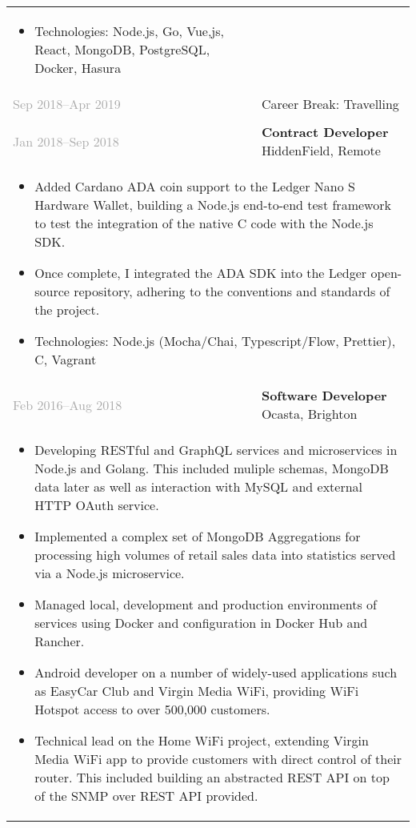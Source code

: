 \documentclass{article}
\newenvironment{exptable}{
  \begin{longtable}{lp{0.8\textwidth}}
  }{
  \end{longtable}
}
\begin{document}
\begin{exptable}
{        \begin{itemize}[leftmargin=1em]
          \item[] Technologies: Node.js, Go, Vue,js, React, MongoDB, PostgreSQL, Docker, Hasura
        \end{itemize}
      } \\

      \textcolor{darkgray}{Sep 2018--Apr 2019} & Career Break: Travelling \\
      \multicolumn{2}{p{\textwidth}}{} \\

      \textcolor{darkgray}{Jan 2018--Sep 2018} & \textbf{Contract Developer} HiddenField, Remote \\
      \multicolumn{2}{p{\textwidth}}{
        \begin{itemize}
          \item Added Cardano ADA coin support to the Ledger Nano S Hardware Wallet, building a Node.js end-to-end test framework to test the integration of the native C code with the Node.js SDK.
          \item Once complete, I integrated the ADA SDK into the Ledger open-source repository, adhering to the conventions and standards of the project.
        \end{itemize}

        \vspace{1em}

        \begin{itemize}[leftmargin=1em]
          \item[] Technologies: Node.js (Mocha/Chai, Typescript/Flow, Prettier), C, Vagrant
        \end{itemize}
      } \\

      \textcolor{darkgray}{Feb 2016--Aug 2018} & \textbf{Software Developer} Ocasta, Brighton \\
      \multicolumn{2}{p{\textwidth}}{
        \begin{itemize}
          \item Developing RESTful and GraphQL services and microservices in Node.js and Golang. This included muliple schemas, MongoDB data later as well as interaction with MySQL and external HTTP OAuth service.
          \item Implemented a complex set of MongoDB Aggregations for processing high volumes of retail sales data into statistics served via a Node.js microservice.
          \item Managed local, development and production environments of services using Docker and configuration in Docker Hub and Rancher.
          \item Android developer on a number of widely-used applications such as EasyCar Club and Virgin Media WiFi, providing WiFi Hotspot access to over 500,000 customers.
          \item Technical lead on the Home WiFi project, extending Virgin Media WiFi app to provide customers with direct control of their router. This included building an abstracted REST API on top of the SNMP over REST API provided.
        \end{itemize}

}
\end{exptable}
\end{document}
